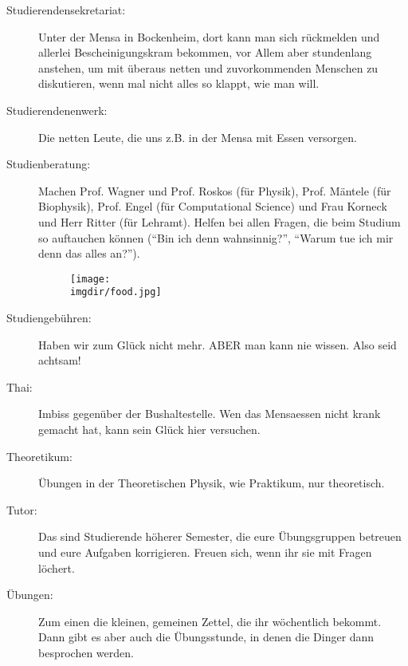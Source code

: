 \begin{description}
    \item[Studierendensekretariat:] Unter der Mensa in Bockenheim, dort kann man sich rückmelden und allerlei Bescheinigungskram bekommen, vor Allem aber stundenlang anstehen, um mit überaus netten und zuvorkommenden Menschen zu diskutieren, wenn mal nicht alles so klappt, wie man will.

    \item[Studierendenenwerk:] Die netten Leute, die uns z.B. in der Mensa mit Essen versorgen.

    \item[Studienberatung:] Machen Prof. Wagner und Prof. Roskos (für Physik), Prof. Mäntele (für Biophysik), Prof. Engel (für Computational Science) und Frau Korneck und Herr Ritter (für Lehramt). Helfen bei allen Fragen, die beim Studium so auftauchen können (\enquote{Bin ich denn wahnsinnig?}, \enquote{Warum tue ich mir denn das alles an?}).

\begin{figure}
	\centering
    \texttt{[image: \\imgdir/food.jpg]}
\end{figure}

	\item[Studiengebühren:] Haben wir zum Gl\"uck nicht mehr. ABER man kann nie wissen. Also seid achtsam!

	\item[Thai:] Imbiss gegen\"uber der Bushaltestelle. Wen das Mensaessen nicht krank gemacht hat, kann sein Gl\"uck hier versuchen.

 	\item[Theoretikum:] Übungen in der Theoretischen Physik, wie Praktikum, nur theoretisch.

    \item[Tutor:] Das sind Studierende höherer Semester, die eure Übungsgruppen betreuen und eure Aufgaben korrigieren. Freuen sich, wenn ihr sie mit Fragen löchert.

    \item[Übungen:] Zum einen die kleinen, gemeinen Zettel, die ihr wöchentlich bekommt. Dann gibt es aber auch die Übungsstunde, in denen die Dinger dann besprochen werden.



\end{description}

